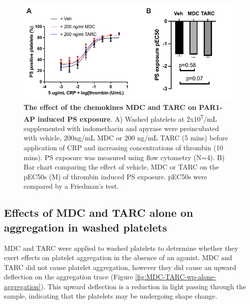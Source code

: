 \documentclass[11pt,twoside]{bristolthesis}
\begin{document}
\begin{figure}
\includegraphics{figure/Chemokines/Layouts/MDC_TARC_PS_exposure_layout} \caption[The effect of the chemokines MDC and TARC on PAR1-AP induced PS exposure]{\textbf{The effect of the chemokines MDC and TARC on PAR1-AP induced PS exposure}. A) Washed platelets at 2x10\textsuperscript{7}/mL supplemented with indomethacin and apyrase were preincubated with vehicle, 200ng/mL MDC or 200 ng/mL TARC (5 mins) before application of CRP and increasing concentrations of thrombin (10 mins). PS exposure was measured using flow cytometry (N=4). B) Bar chart comparing the effect of vehicle, MDC or TARC on the pEC50s (M) of thrombin induced PS exposure. pEC50s were compared by a Friedman's test.}\label{fig:MDC-TARC-PS-exposure}
\end{figure}
\hypertarget{effects-of-mdc-and-tarc-alone-on-aggregation-in-washed-platelets}{%
\subsection{Effects of MDC and TARC alone on aggregation in washed platelets}\label{effects-of-mdc-and-tarc-alone-on-aggregation-in-washed-platelets}}

MDC and TARC were applied to washed platelets to determine whether they exert effects on platelet aggregation in the absence of an agonist. MDC and TARC did not cause platelet aggregation, however they did cause an upward deflection on the aggregation trace (Figure \ref{fig:MDC-TARC-wp-alone-aggregation}). This upward deflection is a reduction in light passing through the sample, indicating that the platelets may be undergoing shape change.
\end{document}
